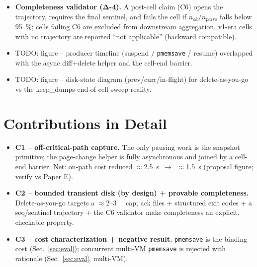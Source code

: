 \documentclass[conference]{IEEEtran}
\begin{document}
\begin{itemize}
        This guarantees the trajectory is complete (or its gaps are explicitly
        recorded) before downstream analysis.
  \item \textbf{Completeness validator (Δ-4).} A post-cell claim (C6) opens the
        trajectory, requires the final sentinel, and fails the cell if
        $n_{ok}/n_{pairs}$ falls below \SI{95}{\percent}; cells failing C6 are
        excluded from downstream aggregation. v1-era cells with no trajectory
        are reported ``not applicable'' (backward compatible).
  \item TODO: figure -- producer timeline (suspend / \texttt{pmemsave} / resume)
        overlapped with the async diff+delete helper and the cell-end barrier.
  \item TODO: figure -- disk-state diagram (prev/curr/in-flight) for
        delete-as-you-go vs the keep\_dumps end-of-cell-sweep reality.
\end{itemize}

\section{Contributions in Detail}
\label{sec:contrib}
\begin{itemize}
  \item \textbf{C1 -- off-critical-path capture.} The only pausing work is the
        snapshot primitive; the page-change helper is fully asynchronous and
        joined by a cell-end barrier. Net: on-path cost reduced
        $\approx$\SI{2.5}{\second}~$\rightarrow$~$\approx$\SI{1.5}{\second}
        (proposal figure; verify vs Paper E).
  \item \textbf{C2 -- bounded transient disk (by design) + provable
        completeness.} Delete-as-you-go targets a $\approx$\SI{2}{}--\SI{3}{\gibi\byte}
        cap; ack files + structured exit codes + a seq/sentinel trajectory +
        the C6 validator make completeness an explicit, checkable property.
  \item \textbf{C3 -- cost characterization + negative result.}
        \texttt{pmemsave} is the binding cost (Sec.~\ref{sec:eval}); concurrent
        multi-VM \texttt{pmemsave} is rejected with rationale
        (Sec.~\ref{sec:eval}, multi-VM).
\end{itemize}
\end{document}

